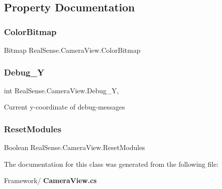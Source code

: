 \subsection{Property Documentation}
\mbox{\label{class_real_sense_1_1_camera_view_a487ce7be920e8f6742d704d97a6057dc}} 
\subsubsection{Color\+Bitmap}
{\footnotesize\ttfamily Bitmap Real\+Sense.\+Camera\+View.\+Color\+Bitmap\hspace{0.3cm}{\ttfamily [get]}}

\mbox{\label{class_real_sense_1_1_camera_view_a5cc5cea08df7b36da52efba2a166e361}} 
\subsubsection{Debug\+\_\+Y}
{\footnotesize\ttfamily int Real\+Sense.\+Camera\+View.\+Debug\+\_\+Y\hspace{0.3cm}{\ttfamily [get]}, {\ttfamily [set]}}

Current y-\/coordinate of debug-\/messages \mbox{\label{class_real_sense_1_1_camera_view_a342611e6157bb18b9c097186b3b9bee0}} 
\subsubsection{Reset\+Modules}
{\footnotesize\ttfamily Boolean Real\+Sense.\+Camera\+View.\+Reset\+Modules\hspace{0.3cm}{\ttfamily [set]}}



The documentation for this class was generated from the following file\+:\begin{DoxyCompactItemize}
\item 
Framework/\textbf{ Camera\+View.\+cs}\end{DoxyCompactItemize}
